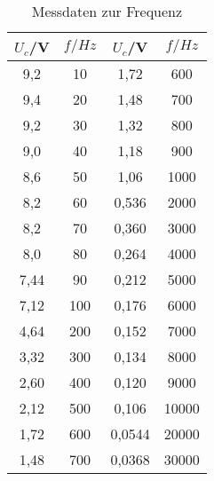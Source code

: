 



%


\begin{table}
  \centering
  \caption{Messdaten zur Frequenz}
  \label{tab:frequenz}
  \begin{tabular}{c c c c}
    \toprule
     $U_c$/V  &		$f/Hz$		&  $U_c$/V  &		$f/Hz$	 \\
          \midrule
    9,2    &   10   &  1,72	   &  600    \\
    9,4    &   20   &  1,48	   &  700    \\
    9,2    &   30   &  1,32	   &  800    \\
    9,0    &   40   &  1,18	   &  900    \\
    8,6    &   50   &  1,06	   &  1000   \\
    8,2    &   60   &  0,536   & 	2000   \\
    8,2    &   70   &  0,360   & 	3000   \\
    8,0    &   80   &  0,264   & 	4000   \\
    7,44	 &   90   &  0,212   & 	5000   \\
    7,12	 &  100   &  0,176   & 	6000   \\
    4,64	 &  200   &  0,152   & 	7000   \\
    3,32	 &  300   &  0,134   & 	8000   \\
    2,60	 &  400   &  0,120   & 	9000   \\
    2,12	 &  500   &  0,106   & 	10000  \\
    1,72	 &  600   &  0,0544  & 	20000  \\
    1,48	 &  700   &  0,0368  & 	30000  \\


    \bottomrule
  \end{tabular}
\end{table}

%
